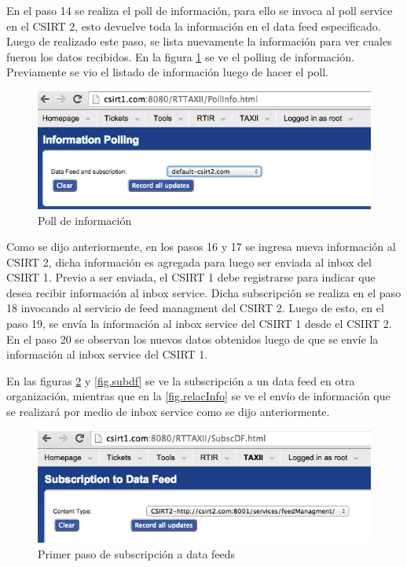 En el paso 14 se realiza el poll de información, para ello se invoca al poll service en el CSIRT 2, esto devuelve toda la información en el data feed especificado. Luego de realizado este paso, se lista nuevamente la información para ver cuales fueron los datos recibidos.
En la figura \ref{fig.pollinfo} se ve el polling de información. Previamente se vio el listado de información luego de hacer el poll.

\begin{figure}[H]
	\centering
	\includegraphics[scale=0.4]{caso-de-estudio/pollinformacion.png}
	\caption{Poll de información}
	\label{fig.pollinfo}
\end{figure}

Como se dijo anteriormente, en los pasos 16 y 17 se ingresa nueva información al CSIRT 2, dicha información es agregada para luego ser enviada al inbox del CSIRT 1. Previo a ser enviada, el CSIRT 1 debe registrarse para indicar que desea recibir información al inbox service. Dicha subscripción se realiza en el paso 18 invocando al servicio de feed managment del CSIRT 2. Luego de esto, en el paso 19, se envía la información al inbox service del CSIRT 1 desde el CSIRT 2.
En el paso 20 se observan los nuevos datos obtenidos luego de que se envíe la información al inbox service del CSIRT 1.

En las figuras \ref{fig.subfeed} y \ref{fig.subdf} se ve la subscripción a un data feed en otra organización, mientras que en la \ref{fig.relacInfo} se ve el envío de información que se realizará por medio de inbox service como se dijo anteriormente.

\begin{figure}[H]
	\centering
	\includegraphics[scale=0.4]{caso-de-estudio/subscriptionfeed.png}
	\caption{Primer paso de subscripción a data feeds}
	\label{fig.subfeed}
\end{figure}

